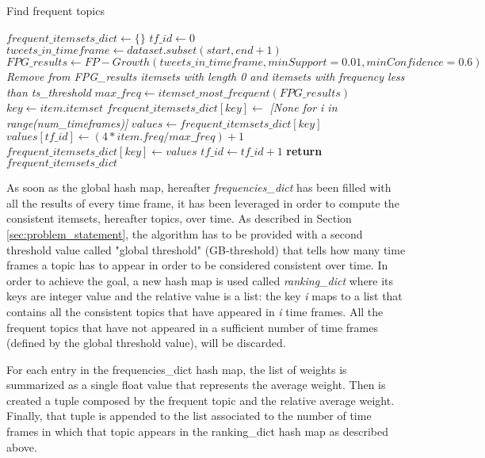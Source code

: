 \begin{algorithm*}
	\caption{Find frequent topics}
	\label{find_frequent_topics_algorithm}
	\begin{algorithmic}[1]
		\State $frequent\_itemsets\_dict\gets \{\}$
		\State $tf\_id\gets 0$
			\State $tweets\_in\_timeframe\gets dataset.subset(start, end + 1)$
			\State $FPG\_results\gets FP-Growth(tweets\_in\_timeframe, minSupport=0.01, minConfidence=0.6)$
			\State \textit{Remove from FPG\_results itemsets with length 0 and itemsets with frequency less than ts\_threshold}
			\State $max\_freq\gets itemset\_most\_frequent(FPG\_results)$
				\State $key\gets item.itemset$
					\State $frequent\_itemsets\_dict[key]\gets $ \textit{[None for i in range(num\_timeframes)]}
				\EndIf
				\State $values\gets frequent\_itemsets\_dict[key]$
				\State $values[tf\_id]\gets (4 * item.freq / max\_freq) + 1$
				\State $frequent\_itemsets\_dict[key]\gets values$
			\EndFor
			\State $tf\_id\gets tf\_id + 1$
		\EndFor
		\State \textbf{return} $frequent\_itemsets\_dict$
		\EndFunction
	\end{algorithmic}
\end{algorithm*}

As soon as the global hash map, hereafter \textit{frequencies\_dict} has been filled with all the results of every time frame, it has been leveraged in order to compute the consistent itemsets, hereafter topics, over time. As described in Section \ref{sec:problem_statement}, the algorithm has to be provided with a second threshold value called "global threshold" (GB-threshold) that tells how many time frames a topic has to appear in order to be considered consistent over time. In order to achieve the goal, a new hash map is used called \textit{ranking\_dict} where its keys are integer value and the relative value is a list: the key \textit{i} maps to a list that contains all the consistent topics that have appeared in \textit{i} time frames. All the frequent topics that have not appeared in a sufficient number of time frames (defined by the global threshold value), will be discarded. 

\noindent For each entry in the frequencies\_dict hash map, the list of weights is summarized as a single float value that represents the average weight. Then is created a tuple composed by the frequent topic and the relative average weight. Finally, that tuple is appended to the list associated to the number of time frames in which that topic appears in the ranking\_dict hash map as described above. 

